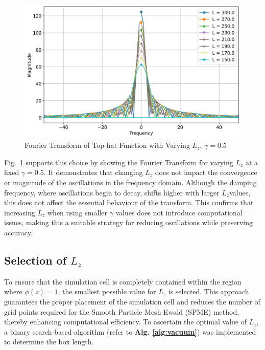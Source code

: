\begin{figure}[htbp]
  \centering
  \includegraphics[width=\linewidth]{images/fourieroftophatvaryL_gamma0.5.jpg}
  \caption{Fourier Transform of Top-hat Function with Varying $L_z$, $\gamma = 0.5$}
  \label{fig:fourieroftophatvaryL_gamma0}
\end{figure}

Fig.~\ref{fig:fourieroftophatvaryL_gamma0} supports this choice by showing the Fourier Transform for varying $L_z$ at a fixed $\gamma = 0.5$. It demonstrates that changing $L_z$ does not impact the convergence or magnitude of the oscillations in the frequency domain. Although the damping frequency, where oscillations begin to decay, shifts higher with larger $L_z$values, this does not affect the essential behaviour of the transform. This confirms that increasing $L_z$ when using smaller $\gamma$ values does not introduce computational issues, making this a suitable strategy for reducing oscillations while preserving accuracy.

\subsection{Selection of  $L_z$}
To ensure that the simulation cell is completely contained within the region where $\phi(z) = 1$, the smallest possible value for $L_z$ is selected. This approach guarantees the proper placement of the simulation cell and reduces the number of grid points required for the Smooth Particle Mesh Ewald (SPME) method, thereby enhancing computational efficiency. To ascertain the optimal value of $L_z$, a binary search-based algorithm (refer to \textbf{Alg. \ref{alg:vacuum}}) was implemented to determine the box length.

